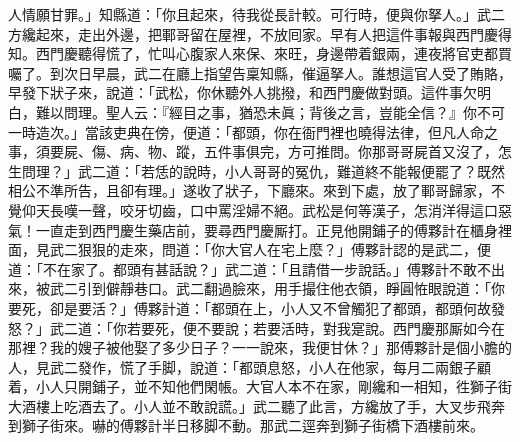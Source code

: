 人情願甘罪。」知縣道：「你且起來，待我從長計較。{}可行時，便與你拏人。」武二方纔起來，走出外邊，把鄆哥留在屋裡，不放囘家。{}早有人把這件事報與西門慶得知。西門慶聽得慌了，忙叫心腹家人來保、來旺，{}身邊帶着銀兩，連夜將官吏都買囑了。到次日早晨，武二在廳上指望告稟知縣，催逼拏人。誰想這官人受了賄賂，早發下狀子來，說道：「武松，你休聽外人挑撥，和西門慶做對頭。這件事欠明白，難以問理。聖人云：『經目之事，猶恐未眞；背後之言，豈能全信？』你不可一時造次。」當該吏典在傍，便道：「都頭，你在衙門裡也曉得法律，但凡人命之事，須要屍、傷、病、物、蹤，五件事俱完，方可推問。你那哥哥屍首又沒了，怎生問理？」{}武二道：「若恁的說時，小人哥哥的冤仇，難道終不能報便罷了？既然相公不準所告，且卻有理。」遂收了狀子，下廳來。來到下處，放了鄆哥歸家，不覺仰天長嘆一聲，咬牙切齒，口中罵淫婦不絕。武松是何等漢子，怎消洋得這口惡氣！一直走到西門慶生藥店前，要尋西門慶厮打。正見他開鋪子的傅夥計在櫃身裡面，見武二狠狠的走來，問道：「你大官人在宅上麼？」傅夥計認的是武二，便道：「不在家了。都頭有甚話說？」武二道：「且請借一步說話。」傅夥計不敢不出來，被武二引到僻靜巷口。武二翻過臉來，用手撮住他衣領，睜圓恠眼說道：「你要死，卻是要活？」{}傅夥計道：「都頭在上，小人又不曾觸犯了都頭，都頭何故發怒？」武二道：「你若要死，便不要說；若要活時，對我寔說。西門慶那厮如今在那裡？我的嫂子被他娶了多少日子？一一說來，我便甘休？」那傅夥計是個小膽的人，見武二發作，慌了手脚，說道：「都頭息怒，小人在他家，每月二兩銀子顧着，小人只開鋪子，並不知他們閑帳。大官人本不在家，剛纔和一相知，徃獅子街大酒樓上吃酒去了。小人並不敢說謊。」{}武二聽了此言，方纔放了手，大叉步飛奔到獅子街來。嚇的傅夥計半日移脚不動。那武二逕奔到獅子街橋下酒樓前來。

